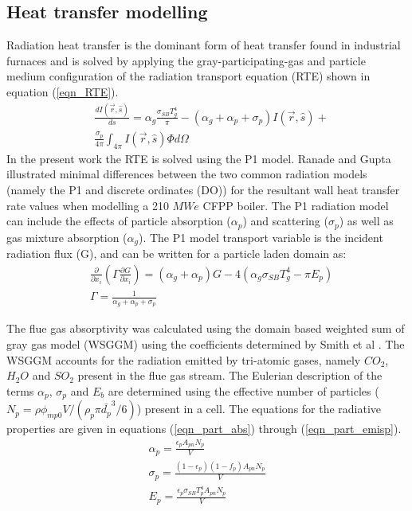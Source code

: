 \documentclass[twocolumn,10pt]{asme2ej}
\begin{document}
\subsection{Heat transfer modelling}
Radiation heat transfer is the dominant form of heat transfer found in industrial furnaces \cite{Basu2000} and is solved by applying the gray-participating-gas and particle medium configuration of the radiation transport equation (RTE) \cite{Modest2013} shown in equation (\ref{eqn_RTE}).
\begin{equation}\label{eqn_RTE}
\begin{split}
&\frac{d I(\vec{r},\hat{s})}{ds} = \alpha_g \frac{\sigma_{SB} T_{g}^4}{\pi}-(\alpha_g+\alpha_p+\sigma_p)I(\vec{r},\hat{s}) + \\
&\frac{\sigma_p}{4\pi}\int_{4\pi}I(\vec{r},\hat{s})\Phi d \Omega
\end{split}
\end{equation}
In the present work the RTE is solved using the P1 model. Ranade and Gupta \cite{Ranade2015} illustrated minimal differences between the two common radiation models (namely the P1 and discrete ordinates (DO)) for the resultant wall heat transfer rate values when modelling a 210 $MWe$ CFPP boiler. The P1 radiation model can include the effects of particle absorption ($\alpha_p$) and scattering ($\sigma_p$) as well as gas mixture absorption ($\alpha_g$). The P1 model transport variable is the incident radiation flux (G), and can be written for a particle laden domain as:
\begin{equation}
\begin{split}
&\frac{\partial}{\partial x_{i}}\left(\Gamma\frac{\partial G}{\partial x_{i}}\right)=\left(\alpha_g+\alpha_p\right)G-4\left(\alpha_g \sigma_{SB} T_{g}^4-\pi E_p \right)\\
&\Gamma = \frac{1}{\alpha_g+\alpha_p+\sigma_p}
\end{split}
\end{equation}

The flue gas absorptivity was calculated using the domain based weighted sum of gray gas model (WSGGM) using the coefficients determined by Smith et al \cite{Smith1982}. The WSGGM accounts for the radiation emitted by tri-atomic gases, namely $CO_2$, $H_2O$ and $SO_2$ present in the flue gas stream. The Eulerian description of the terms $\alpha_p$, $\sigma_p$ and $E_b$ are determined using the effective number of particles ($N_p = \rho \phi_{mp0} V / \left( \rho_p \pi \bar{d_p}^3 /6 \right)$) present in a cell. The equations for the radiative properties are given in equations (\ref{eqn_part_abs}) through (\ref{eqn_part_emisp}).
\begin{gather}
\alpha_p = \frac{\epsilon_p A_{pn}N_p}{V} \label{eqn_part_abs}\\
\sigma_p = \frac{(1-\epsilon_p)(1-f_p) A_{pn}N_p}{V} \label{eqn_part_scat} \\
E_p = \frac{\epsilon_p \sigma_{SB} T_p^4 A_{pn}N_p}{V}\label{eqn_part_emisp}
\end{gather}
\end{document}
